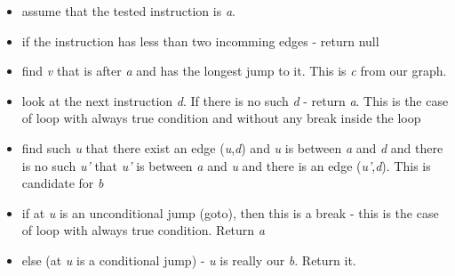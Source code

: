 \documentclass{article}
\begin{document}
\begin{itemize}
\item{assume that the tested instruction is \textit{a}.}
\item{if the instruction has less than two incomming edges - return null}
\item{find \textit{v} that is after \textit{a} and has the longest jump to it. This is \textit{c} from our graph.}
\item{look at the next instruction \textit{d}. If there is no such \textit{d} - return \textit{a}. This is the case of loop with always true condition and without any break inside the loop}
\item{find such \textit{u} that there exist an edge (\textit{u},\textit{d}) and \textit{u} is between \textit{a} and \textit{d} and there is no such \textit{u'} that \textit{u'} is between \textit{a} and \textit{u} and there is an edge (\textit{u'},\textit{d}). This is candidate for \textit{b}}
\item{if at \textit{u} is an unconditional jump (goto), then this is a break - this is the case of loop with always true condition. Return \textit{a}}
\item{else (at \textit{u} is a conditional jump) - \textit{u} is really our \textit{b}. Return it.}
\end{itemize}
\end{document}
